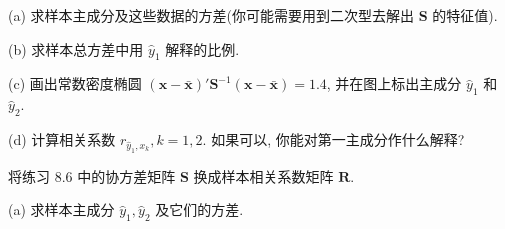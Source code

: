 (a) 求样本主成分及这些数据的方差(你可能需要用到二次型去解出 $\mathbf{S}$ 的特征值).

(b) 求样本总方差中用 $\hat{y}_1$ 解释的比例.

(c) 画出常数密度椭圆 $(\mathbf{x}-\bar{\mathbf{x}})'\mathbf{S}^{-1}(\mathbf{x}-\bar{\mathbf{x}})=1.4$, 并在图上标出主成分 $\hat{y}_1$ 和 $\hat{y}_2$.

(d) 计算相关系数 $r_{\hat{y}_1,x_k},k=1,2$. 如果可以, 你能对第一主成分作什么解释?

\quad 将练习 8.6 中的协方差矩阵 $\mathbf{S}$ 换成样本相关系数矩阵 $\mathbf{R}$.

(a) 求样本主成分 $\hat{y}_1,\hat{y}_2$ 及它们的方差.
